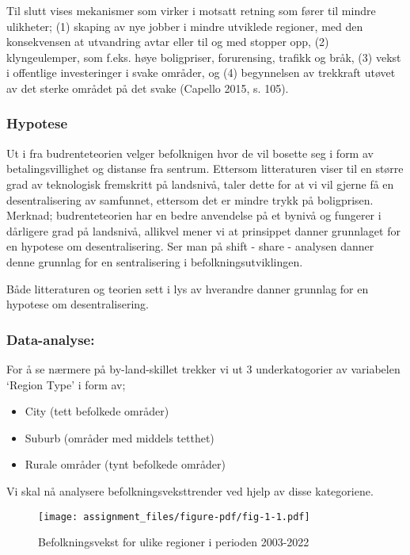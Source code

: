 \documentclass[
  letterpaper,
  DIV=11,
  numbers=noendperiod]{scrartcl}
\begin{document}
Til slutt vises mekanismer som virker i motsatt retning som fører til
mindre ulikheter; (1) skaping av nye jobber i mindre utviklede regioner,
med den konsekvensen at utvandring avtar eller til og med stopper opp,
(2) klyngeulemper, som f.eks. høye boligpriser, forurensing, trafikk og
bråk, (3) vekst i offentlige investeringer i svake områder, og (4)
begynnelsen av trekkraft utøvet av det sterke området på det svake
(Capello 2015, s. 105).

\hypertarget{hypotese}{%
\subsubsection{Hypotese}\label{hypotese}}

Ut i fra budrenteteorien velger befolknigen hvor de vil bosette seg i
form av betalingsvillighet og distanse fra sentrum. Ettersom
litteraturen viser til en større grad av teknologisk fremskritt på
landsnivå, taler dette for at vi vil gjerne få en desentralisering av
samfunnet, ettersom det er mindre trykk på boligprisen. Merknad;
budrenteteorien har en bedre anvendelse på et bynivå og fungerer i
dårligere grad på landsnivå, allikvel mener vi at prinsippet danner
grunnlaget for en hypotese om desentralisering. Ser man på shift - share
- analysen danner denne grunnlag for en sentralisering i
befolkningsutviklingen.

Både litteraturen og teorien sett i lys av hverandre danner grunnlag for
en hypotese om desentralisering.

\hypertarget{data-analyse}{%
\subsubsection{\texorpdfstring{\textbf{Data-analyse:}}{Data-analyse:}}\label{data-analyse}}

For å se nærmere på by-land-skillet trekker vi ut 3 underkatogorier av
variabelen `Region Type' i form av;~

\begin{itemize}
\item
  City (tett befolkede områder)
\item
  Suburb (områder med middels tetthet)
\item
  Rurale områder (tynt befolkede områder)
\end{itemize}

Vi skal nå analysere befolkningsveksttrender ved hjelp av disse
kategoriene.~

\begin{figure}

{\centering \texttt{[image: assignment\_files/figure-pdf/fig-1-1.pdf]}

}

\caption{\label{fig-1}Befolkningsvekst for ulike regioner i perioden
2003-2022}

\end{figure}
\end{document}
